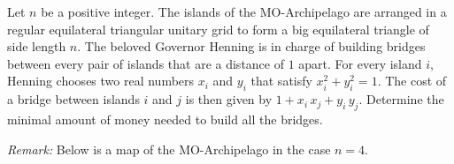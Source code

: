 Let $n$ be a positive integer.
The islands of the MO-Archipelago are arranged in a regular equilateral triangular unitary grid
to form a big equilateral triangle of side length $n$.
The beloved Governor Henning is in charge of building bridges between every pair of islands
that are a distance of $1$ apart.
For every island $i$, Henning chooses two real numbers $x_i$ and $y_i$ that satisfy $x_i^2+y_i^2 = 1$.
The cost of a bridge between islands $i$ and $j$ is then given by $1+ x_i\, x_j + y_i\, y_j$.
Determine the minimal amount of money needed to build all the bridges.

\emph{Remark:} Below is a map of the MO-Archipelago in the case $n=4$.

\bigskip

\begin{center}
\newcommand*\rows{4}
\end{center}

